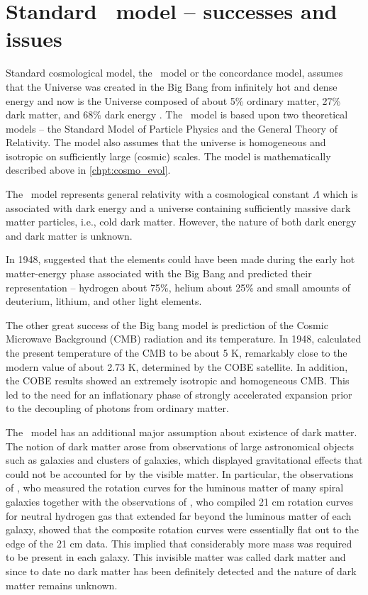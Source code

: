 \section{Standard \LCDM\ model -- successes and issues}
Standard cosmological model, the \LCDM\ model or the concordance model, assumes that the Universe was created in the Big Bang from infinitely hot and dense energy and now is the Universe composed of about 5\% ordinary matter, 27\% dark matter, and 68\% dark energy \parencite{redefineLCDM}. The \LCDM\ model is based upon two theoretical models -- the Standard Model of Particle Physics and  the General Theory of Relativity. The model also assumes that the universe is homogeneous and isotropic on sufficiently large (cosmic) scales. The model is mathematically described above in \autoref{chpt:cosmo_evol}.

The \LCDM\ model represents general relativity with a cosmological constant \(\Lambda\) which is associated with dark energy and a universe containing sufficiently massive dark matter particles, i.e., cold dark matter. However, the nature of both dark energy and dark matter is unknown.

In 1948, \textcite{PhysRev.74.505.2} suggested that the elements could have been made during the early hot matter-energy phase associated with the Big Bang and predicted their representation -- hydrogen about 75\%, helium about 25\% and small amounts of deuterium, lithium, and other light elements.

The other great success of the Big bang model is prediction of the Cosmic Microwave Background (CMB) radiation and its temperature. In 1948, \textcite{1948Natur.162..774A} calculated the present temperature of the CMB to be about 5 K, remarkably close to the modern value of about 2.73 K, determined by the COBE satellite. In addition, the COBE results showed an extremely isotropic and homogeneous CMB. This led to the need for an inflationary phase \parencite{1981PhRvD..23..347G} of strongly accelerated expansion prior to the decoupling of photons from ordinary matter.

The \LCDM\ model has an additional major assumption about existence of dark matter. The notion of dark matter arose from observations of large astronomical objects such as galaxies and clusters of galaxies, which displayed gravitational effects that could not be accounted for by the visible matter. In particular, the observations of \textcite{1980ApJ...238..471R}, who measured the rotation curves for the luminous matter of many spiral galaxies together with the observations of \textcite{1978PhDT.......195B}, who compiled 21 cm rotation curves for neutral hydrogen gas that extended far beyond the luminous matter of each galaxy, showed that the composite rotation curves were essentially flat out to the edge of the 21 cm data. This implied that considerably more mass was required to be present in each galaxy. This invisible matter was called dark matter and since to date no dark matter has been definitely detected and the nature of dark matter remains unknown.

